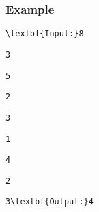 \subsubsection{Example}
\begin{verbatim}
\textbf{Input:}8 \end{verbatim}
\begin{verbatim}
3 \end{verbatim}
\begin{verbatim}
5 \end{verbatim}
\begin{verbatim}
2 \end{verbatim}
\begin{verbatim}
3 \end{verbatim}
\begin{verbatim}
1 \end{verbatim}
\begin{verbatim}
4 \end{verbatim}
\begin{verbatim}
2 \end{verbatim}
\begin{verbatim}
3\textbf{Output:}4\end{verbatim}